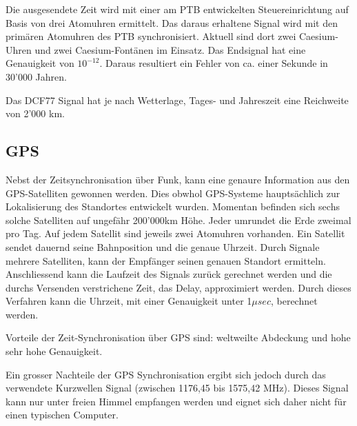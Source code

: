 Die ausgesendete Zeit wird mit einer am PTB entwickelten Steuereinrichtung auf Basis von drei Atomuhren ermittelt. Das daraus erhaltene Signal wird mit den primären Atomuhren des PTB synchronisiert. Aktuell sind dort zwei Caesium-Uhren und zwei Caesium-Fontänen im Einsatz. Das Endsignal hat eine Genauigkeit von $10^{-12}$. Daraus resultiert ein Fehler von ca. einer Sekunde in 30'000 Jahren.

Das DCF77 Signal hat je nach Wetterlage, Tages- und Jahreszeit eine Reichweite von 2'000 km.

\subsection{GPS}
Nebst der Zeitsynchronisation über Funk, kann eine genaure Information aus den GPS-Satelliten gewonnen werden. Dies obwhol GPS-Systeme hauptsächlich zur Lokalisierung des Standortes entwickelt wurden.
Momentan befinden sich sechs solche Satelliten auf ungefähr 200'000km Höhe. Jeder umrundet die Erde zweimal pro Tag. Auf jedem Satellit sind jeweils zwei Atomuhren vorhanden.
Ein Satellit sendet dauernd seine Bahnposition und die genaue Uhrzeit. Durch Signale mehrere Satelliten, kann der Empfänger seinen genauen Standort ermitteln.
Anschliessend kann die Laufzeit des Signals zurück gerechnet werden und die durchs Versenden verstrichene Zeit, das Delay, approximiert werden.
Durch dieses Verfahren kann die Uhrzeit, mit einer Genauigkeit unter 1${\mu}sec$, berechnet werden.

Vorteile der Zeit-Synchronisation über GPS sind: weltweilte Abdeckung und hohe sehr hohe Genauigkeit.

Ein grosser Nachteile der GPS Synchronisation ergibt sich jedoch durch das verwendete Kurzwellen Signal (zwischen 1176,45 bis 1575,42 MHz). Dieses Signal kann nur unter freien Himmel empfangen werden und eignet sich daher nicht für einen typischen Computer.



